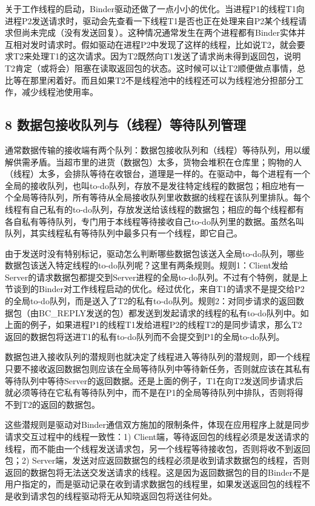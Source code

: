 \documentclass[a4paper,11pt]{article}
\begin{document}
关于工作线程的启动，Binder驱动还做了一点小小的优化。当进程P1的线程T1向进程P2发送请求时，驱动会先查看一下线程T1是否也正在处理来自P2某个线程请求但尚未完成（没有发送回复）。这种情况通常发生在两个进程都有Binder实体并互相对发时请求时。假如驱动在进程P2中发现了这样的线程，比如说T2，就会要求T2来处理T1的这次请求。因为T2既然向T1发送了请求尚未得到返回包，说明T2肯定（或将会）阻塞在读取返回包的状态。这时候可以让T2顺便做点事情，总比等在那里闲着好。而且如果T2不是线程池中的线程还可以为线程池分担部分工作，减少线程池使用率。

\subsection{8 数据包接收队列与（线程）等待队列管理}
通常数据传输的接收端有两个队列：数据包接收队列和（线程）等待队列，用以缓解供需矛盾。当超市里的进货（数据包）太多，货物会堆积在仓库里；购物的人（线程）太多，会排队等待在收银台，道理是一样的。在驱动中，每个进程有一个全局的接收队列，也叫to-do队列，存放不是发往特定线程的数据包；相应地有一个全局等待队列，所有等待从全局接收队列里收数据的线程在该队列里排队。每个线程有自己私有的to-do队列，存放发送给该线程的数据包；相应的每个线程都有各自私有等待队列，专门用于本线程等待接收自己to-do队列里的数据。虽然名叫队列，其实线程私有等待队列中最多只有一个线程，即它自己。

由于发送时没有特别标记，驱动怎么判断哪些数据包该送入全局to-do队列，哪些数据包该送入特定线程的to-do队列呢？这里有两条规则。规则1：Client发给Server的请求数据包都提交到Server进程的全局to-do队列。不过有个特例，就是上节谈到的Binder对工作线程启动的优化。经过优化，来自T1的请求不是提交给P2的全局to-do队列，而是送入了T2的私有to-do队列。规则2：对同步请求的返回数据包（由BC_REPLY发送的包）都发送到发起请求的线程的私有to-do队列中。如上面的例子，如果进程P1的线程T1发给进程P2的线程T2的是同步请求，那么T2返回的数据包将送进T1的私有to-do队列而不会提交到P1的全局to-do队列。

数据包进入接收队列的潜规则也就决定了线程进入等待队列的潜规则，即一个线程只要不接收返回数据包则应该在全局等待队列中等待新任务，否则就应该在其私有等待队列中等待Server的返回数据。还是上面的例子，T1在向T2发送同步请求后就必须等待在它私有等待队列中，而不是在P1的全局等待队列中排队，否则将得不到T2的返回的数据包。

这些潜规则是驱动对Binder通信双方施加的限制条件，体现在应用程序上就是同步请求交互过程中的线程一致性：1) Client端，等待返回包的线程必须是发送请求的线程，而不能由一个线程发送请求包，另一个线程等待接收包，否则将收不到返回包；2) Server端，发送对应返回数据包的线程必须是收到请求数据包的线程，否则返回的数据包将无法送交发送请求的线程。这是因为返回数据包的目的Binder不是用户指定的，而是驱动记录在收到请求数据包的线程里，如果发送返回包的线程不是收到请求包的线程驱动将无从知晓返回包将送往何处。
\end{document}
